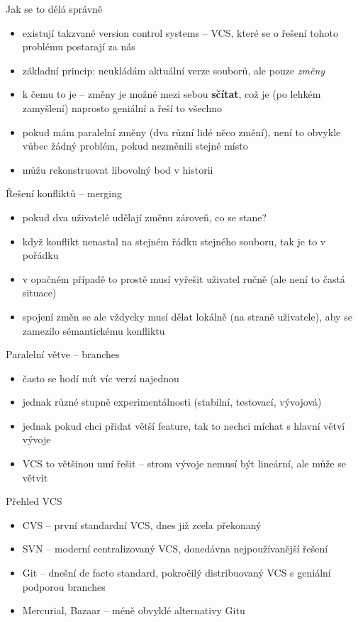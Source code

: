 \documentclass{beamer}
\begin{document}
\begin{frame}{Jak se to dělá správně}
  \begin{itemize}
    \item existují takzvané version control systems -- VCS, které se o řešení tohoto problému postarají za nás
    \item základní princip: neukládám aktuální verze souborů, ale pouze \emph{změny}
    \item k čemu to je -- změny je možné mezi sebou \textbf{sčítat}, což je (po lehkém zamyšlení) naprosto geniální a řeší to všechno
    \item pokud mám paralelní změny (dva různí lidé něco změní), není to obvykle vůbec žádný problém, pokud nezměnili stejné místo
    \item můžu rekonstruovat libovolný bod v historii
  \end{itemize}
\end{frame}

\begin{frame}{Řešení konfliktů -- merging}
  \begin{itemize}
    \item pokud dva uživatelé udělají změnu zároveň, co se stane?
    \item když konflikt nenastal na stejném řádku stejného souboru, tak je to v pořádku
    \item v opačném případě to prostě musí vyřešit uživatel ručně (ale není to častá situace)
    \item spojení změn se ale vždycky musí dělat lokálně (na straně uživatele), aby se zamezilo sémantickému konfliktu
  \end{itemize}
\end{frame}

\begin{frame}{Paralelní větve -- branches}
  \begin{itemize}
    \item často se hodí mít víc verzí najednou
    \item jednak různé stupně experimentálnosti (stabilní, testovací, vývojová)
    \item jednak pokud chci přidat větší feature, tak to nechci míchat s hlavní větví vývoje
    \item VCS to většinou umí řešit -- strom vývoje nemusí být lineární, ale může se větvit
  \end{itemize}
\end{frame}

\begin{frame}{Přehled VCS}
  \begin{itemize}
    \item CVS -- první standardní VCS, dnes již zcela překonaný
    \item SVN -- moderní centralizovaný VCS, donedávna nejpoužívanější řešení
    \item Git -- dnešní de facto standard, pokročilý distribuovaný VCS s geniální podporou branches
    \item Mercurial, Bazaar -- méně obvyklé alternativy Gitu
  \end{itemize}
\end{frame}
\end{document}
